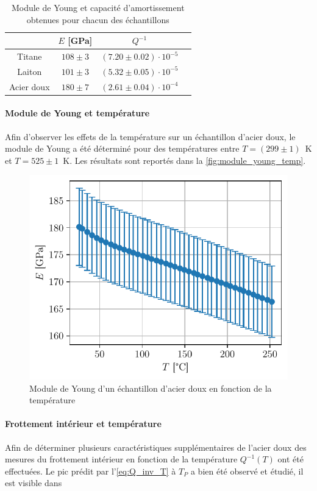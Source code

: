 \begin{table}[h]
    \centering
    \begin{tabulary}{0.9\linewidth}{c|C C C}
        \toprule
        & \(E\) [\si{\giga\pascal}] & \(Q^{-1}\) \\
        \midrule
        Titane & \(108 \pm 3\) & \(\left(7.20 \pm 0.02\right) \cdot 10^{-5}\) \\
        Laiton & \(101 \pm 3\) & \(\left(5.32 \pm 0.05\right) \cdot 10^{-5}\) \\
        Acier doux & \(180 \pm 7\) & \(\left(2.61 \pm 0.04\right) \cdot 10^{-4}\) \\
        \bottomrule
    \end{tabulary}    
    \caption{Module de Young et capacité d'amortissement obtenues pour chacun des échantillons}
    \label{tab:young_amortissement}
\end{table}

\paragraph{Module de Young et température} Afin d'observer les effets de la température sur un échantillon d'acier doux, le module de Young a été déterminé pour des températures entre \mbox{\(T = (299 \pm 1)\) \si{\kelvin}} et \mbox{\(T = 525 \pm 1\) \si{\kelvin}}. Les résultats sont reportés dans la \autoref{fig:module_young_temp}.

\begin{figure}[h]
    \centering
    \includegraphics[width=0.6\linewidth]{figures/acier_doux_module_young_temp.pdf}
    \caption{Module de Young d'un échantillon d'acier doux en fonction de la température}
    \label{fig:module_young_temp}
\end{figure}

\paragraph{Frottement intérieur et température} Afin de déterminer plusieurs caractéristiques supplémentaires de l'acier doux des mesures du frottement intérieur en fonction de la température $Q^{-1}(T)$ ont été effectuées. Le pic prédit par l'\autoref{eq:Q_inv_T} à $T_P$ a bien été observé et étudié, il est visible dans


